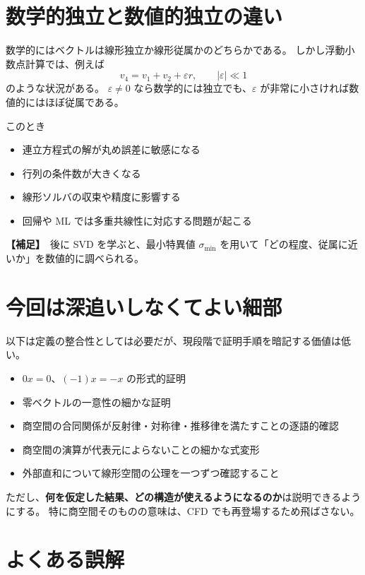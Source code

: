 \documentclass[a4paper,11pt]{ltjsarticle}
\newcommand{\suppitem}{\textbf{【補足】}}
\begin{document}
\section{数学的独立と数値的独立の違い}

数学的にはベクトルは線形独立か線形従属かのどちらかである。
しかし浮動小数点計算では、例えば
\[
v_4=v_1+v_2+\varepsilon r,
\qquad |\varepsilon|\ll1
\]
のような状況がある。
$\varepsilon\neq0$ なら数学的には独立でも、$\varepsilon$ が非常に小さければ数値的にはほぼ従属である。

このとき
\begin{itemize}
  \item 連立方程式の解が丸め誤差に敏感になる
  \item 行列の条件数が大きくなる
  \item 線形ソルバの収束や精度に影響する
  \item 回帰や ML では多重共線性に対応する問題が起こる
\end{itemize}

\suppitem\ 後に SVD を学ぶと、最小特異値 $\sigma_{\min}$ を用いて「どの程度、従属に近いか」を数値的に調べられる。

\section{今回は深追いしなくてよい細部}

以下は定義の整合性としては必要だが、現段階で証明手順を暗記する価値は低い。
\begin{itemize}
  \item $0x=0$、$(-1)x=-x$ の形式的証明
  \item 零ベクトルの一意性の細かな証明
  \item 商空間の合同関係が反射律・対称律・推移律を満たすことの逐語的確認
  \item 商空間の演算が代表元によらないことの細かな式変形
  \item 外部直和について線形空間の公理を一つずつ確認すること
\end{itemize}

ただし、\textbf{何を仮定した結果、どの構造が使えるようになるのか}は説明できるようにする。
特に商空間そのものの意味は、CFD でも再登場するため飛ばさない。

\section{よくある誤解}
\end{document}
